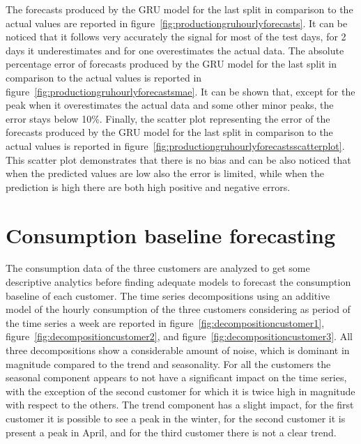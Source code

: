 The forecasts produced by the GRU model for the last split in comparison to the actual values are reported in figure~\ref{fig:productiongruhourlyforecasts}.
It can be noticed that it follows very accurately the signal for most of the test days, for 2 days it underestimates and for one overestimates the actual data.
The absolute percentage error of forecasts produced by the GRU model for the last split in comparison to the actual values is reported in figure~\ref{fig:productiongruhourlyforecastsmae}.
It can be shown that, except for the peak when it overestimates the actual data and some other minor peaks, the error stays below 10\%.
Finally, the scatter plot representing the error of the forecasts produced by the GRU model for the last split in comparison to the actual values is reported in figure~\ref{fig:productiongruhourlyforecastsscatterplot}.
This scatter plot demonstrates that there is no bias and can be also noticed that when the predicted values are low also the error is limited, while when the prediction is high there are both high positive and negative errors.



\section{Consumption baseline forecasting} 
\label{sec:baselineval}
\vspace{0.2 cm}

The consumption data of the three customers are analyzed to get some descriptive analytics before finding adequate models to forecast the consumption baseline of each customer.
The time series decompositions using an additive model of the hourly consumption of the three customers considering as period of the time series a week are reported in figure~\ref{fig:decompositioncustomer1}, figure~\ref{fig:decompositioncustomer2}, and figure~\ref{fig:decompositioncustomer3}.
All three decompositions show a considerable amount of noise, which is dominant in magnitude compared to the trend and seasonality.
For all the customers the seasonal component appears to not have a significant impact on the time series, with the exception of the second customer for which it is twice high in magnitude with respect to the others.
The trend component has a slight impact, for the first customer it is possible to see a peak in the winter, for the second customer it is present a peak in April, and for the third customer there is not a clear trend.

